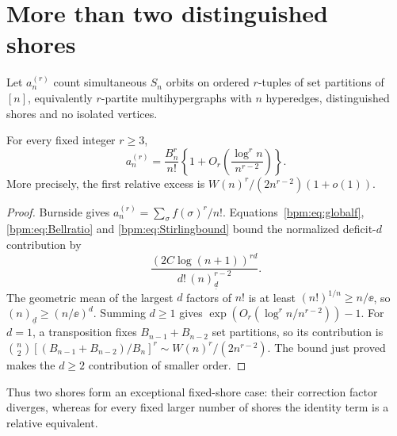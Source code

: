 \documentclass[11pt,a4paper]{article}
\theoremstyle{remark}\newtheorem{remark}[theorem]{Remark}%
\newcommand{\fall}[2]{(#1)_{\underline{#2}}}\newcommand{\rise}[2]{(#1)^{\overline{#2}}}
\begin{document}
\section{More than two distinguished shores}\label{bpm:sec:shores}
Let $a_n^{(r)}$ count simultaneous $S_n$ orbits on ordered $r$-tuples
of set partitions of $[n]$, equivalently $r$-partite multihypergraphs
with $n$ hyperedges, distinguished shores and no isolated vertices.
\begin{proposition}\label{bpm:prop:shores}
For every fixed integer $r\ge3$,
\[
 a_n^{(r)}=\frac{B_n^r}{n!}
 \left\{1+O_r\!\left(\frac{\log^r n}{n^{r-2}}\right)\right\}.
\]
More precisely, the first relative excess is
$W(n)^r/(2n^{r-2})(1+o(1))$.
\end{proposition}
\begin{proof}
Burnside gives $a_n^{(r)}=\sum_\sigma f(\sigma)^r/n!$.
Equations~\eqref{bpm:eq:globalf}, \eqref{bpm:eq:Bellratio} and
\eqref{bpm:eq:Stirlingbound} bound the normalized deficit-$d$ contribution by
\[
 \frac{(2C\log(n+1))^{rd}}{d!\,\fall nd^{r-2}}.
\]
The geometric mean of the largest $d$ factors of $n!$ is at least
$(n!)^{1/n}\ge n/\ee$, so $\fall nd\ge(n/\ee)^d$.
Summing $d\ge1$ gives $\exp(O_r(\log^r n/n^{r-2}))-1$.
For $d=1$, a transposition fixes $B_{n-1}+B_{n-2}$ set partitions,
so its contribution is
$\binom n2[(B_{n-1}+B_{n-2})/B_n]^r\sim W(n)^r/(2n^{r-2})$.
The bound just proved makes the $d\ge2$ contribution of smaller order.
\end{proof}
Thus two shores form an exceptional fixed-shore case: their correction
factor diverges, whereas for every fixed larger number of shores the
identity term is a relative equivalent.
\end{document}
